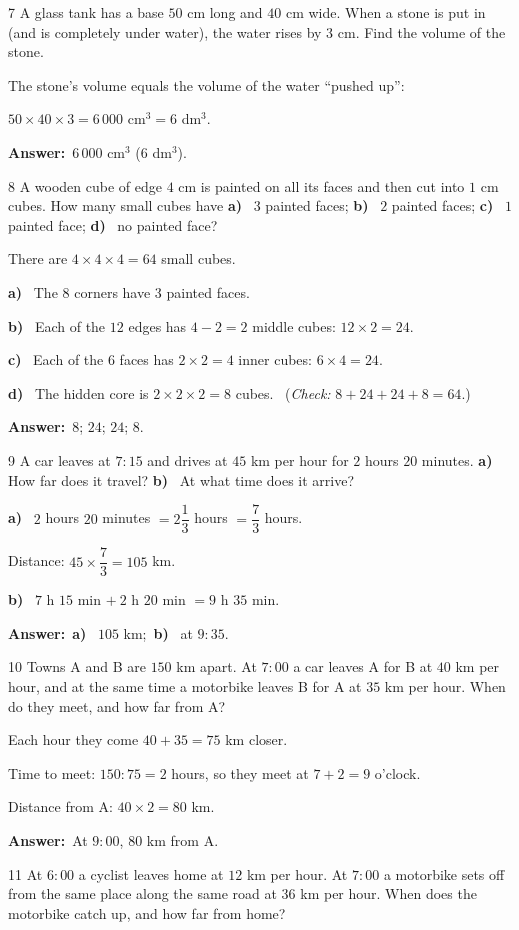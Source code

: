 \documentclass[11pt]{article}
\newif\ifsol \solfalse
\providecommand{\AnsWord}{Đáp số}
\newcommand{\dapso}[1]{\par\textbf{\AnsWord:}\ #1}
\newcommand{\probsol}[1]{%
  \begin{lrbox}{\solmeasure}\begin{minipage}{\dimexpr\linewidth-24pt\relax}#1\end{minipage}\end{lrbox}%
  \ifsol
    \begin{solbox}#1\end{solbox}%
  \else
    \setlength{\solht}{\dimexpr\ht\solmeasure+\dp\solmeasure+0.85cm\relax}%
    \ifdim\solht<1.35cm\setlength{\solht}{1.35cm}\fi
    \begin{tcolorbox}[colback=white,colframe=Line,boxrule=0.8pt,arc=5pt,
      left=8pt,right=8pt,top=4pt,bottom=4pt,height=\solht]{\footnotesize\color{Slate}\itshape\WorkWord}\end{tcolorbox}%
  \fi}
\newcommand{\pa}[1]{\textbf{#1)}\ }
\newcommand{\gap}{\vspace{0.3cm}}
\def\WorkWord{Your work:}
\def\AnsWord{Answer}
\begin{document}
\gap
\begin{probbox}{7}{\relax}
A glass tank has a base $50$ cm long and $40$ cm wide. When a stone is put in (and is completely under water), the water rises by $3$ cm. Find the volume of the stone.
\end{probbox}
\probsol{
The stone's volume equals the volume of the water ``pushed up'':\par
$50\times40\times3=6\,000$ cm$^3=6$ dm$^3$.
\dapso{$6\,000$ cm$^3$ ($6$ dm$^3$).}}
\gap
\begin{probbox}{8}{\relax}
A wooden cube of edge $4$ cm is painted on all its faces and then cut into $1$ cm cubes. How many small cubes have \pa{a} $3$ painted faces; \pa{b} $2$ painted faces; \pa{c} $1$ painted face; \pa{d} no painted face?
\end{probbox}
\probsol{
There are $4\times4\times4=64$ small cubes.\par
\pa{a} The $8$ corners have $3$ painted faces.\par
\pa{b} Each of the $12$ edges has $4-2=2$ middle cubes: $12\times2=24$.\par
\pa{c} Each of the $6$ faces has $2\times2=4$ inner cubes: $6\times4=24$.\par
\pa{d} The hidden core is $2\times2\times2=8$ cubes. \ (\emph{Check:} $8+24+24+8=64$.)
\dapso{$8$; $24$; $24$; $8$.}}
\gap
\begin{probbox}{9}{\relax}
A car leaves at $7{:}15$ and drives at $45$ km per hour for $2$ hours $20$ minutes. \pa{a} How far does it travel? \pa{b} At what time does it arrive?
\end{probbox}
\probsol{
\pa{a} $2$ hours $20$ minutes $=2\dfrac13$ hours $=\dfrac73$ hours.\par Distance: $45\times\dfrac73=105$ km.\par
\pa{b} $7$ h $15$ min $+\ 2$ h $20$ min $=9$ h $35$ min.
\dapso{\pa{a} $105$ km;\ \pa{b} at $9{:}35$.}}
\gap
\begin{probbox}{10}{\relax}
Towns A and B are $150$ km apart. At $7{:}00$ a car leaves A for B at $40$ km per hour, and at the same time a motorbike leaves B for A at $35$ km per hour. When do they meet, and how far from A?
\end{probbox}
\probsol{
Each hour they come $40+35=75$ km closer.\par
Time to meet: $150:75=2$ hours, so they meet at $7+2=9$ o'clock.\par
Distance from A: $40\times2=80$ km.
\dapso{At $9{:}00$, $80$ km from A.}}
\gap
\begin{probbox}{11}{\relax}
At $6{:}00$ a cyclist leaves home at $12$ km per hour. At $7{:}00$ a motorbike sets off from the same place along the same road at $36$ km per hour. When does the motorbike catch up, and how far from home?
\end{probbox}
\end{document}
